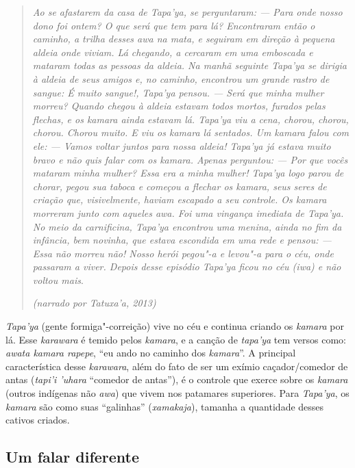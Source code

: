 \begin{quote}
\noindent
\emph{Ao se afastarem da casa de \emph{Tapa'ya}, se perguntaram: --- Para onde
nosso dono foi ontem? O que será que tem para lá? Encontraram então o
caminho, a trilha desses \emph{awa} na mata, e seguiram em direção à
pequena aldeia onde viviam. Lá chegando, a cercaram em uma emboscada e
mataram todas as pessoas da aldeia. Na manhã seguinte \emph{Tapa'ya} se
dirigia à aldeia de seus amigos e, no caminho, encontrou um grande
rastro de sangue: É muito sangue!, \emph{Tapa'ya} pensou. --- Será que
minha mulher morreu? Quando chegou à aldeia estavam todos mortos,
furados pelas flechas, e os \emph{kamara} ainda estavam lá.
\emph{Tapa'ya} viu a cena, chorou, chorou, chorou. Chorou muito. E viu
os \emph{kamara} lá sentados. Um \emph{kamara} falou com ele: --- Vamos
voltar juntos para nossa aldeia! \emph{Tapa'ya} já estava muito bravo e
não quis falar com os \emph{kamara}. Apenas perguntou: --- Por que vocês
mataram minha mulher? Essa era a minha mulher! \emph{Tapa'ya} logo parou
de chorar, pegou sua taboca e começou a flechar os \emph{kamara}, seus
seres de criação que, visivelmente, haviam escapado a seu controle. Os
\emph{kamara} morreram junto com aqueles \emph{awa}. Foi uma vingança
imediata de \emph{Tapa'ya}. No meio da carnificina, \emph{Tapa'ya}
encontrou uma menina, ainda no fim da infância, bem novinha, que estava
escondida em uma rede e pensou: --- Essa não morreu não! Nosso herói
pegou"-a e levou"-a para o céu, onde passaram a viver. Depois desse
episódio \emph{Tapa'ya} ficou no céu (\emph{iwa}) e não voltou mais}.
\begin{flushright}
\emph{(narrado por Tatuxa'a, 2013)}
\end{flushright}
\end{quote}

\emph{Tapa'ya} (gente formiga"-correição) vive no céu e continua criando
os \emph{kamara} por lá. Esse \emph{karawara} é temido pelos
\emph{kamara}, e a canção de \emph{tapa'ya} tem versos como: \emph{awata
kamara rapepe}, ``eu ando no caminho dos \emph{kamara}''. A principal
característica desse \emph{karawara}, além do fato de ser um exímio
caçador/comedor de antas (\emph{tapi'i 'uhara} ``comedor de antas''), é
o controle que exerce sobre os \emph{kamara} (outros indígenas não
\emph{awa}) que vivem nos patamares superiores. Para \emph{Tapa'ya}, os
\emph{kamara} são como suas ``galinhas'' (\emph{xamakaja}), tamanha a
quantidade desses cativos criados.

\subsection{Um falar diferente}

